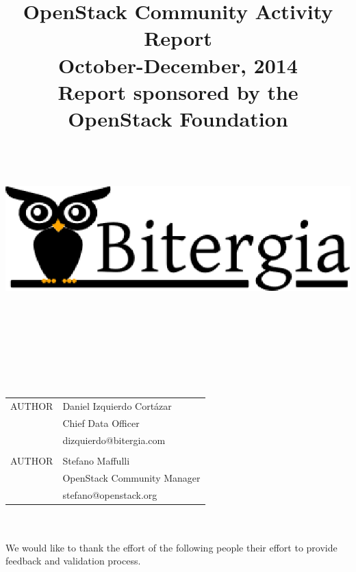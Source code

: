 \documentclass[a4wide,11pt]{report}
\begin{document}
\title{OpenStack Community Activity Report\\
      October-December, 2014 \\
      Report sponsored by the OpenStack Foundation\\
        ~~\\~~\\  \includegraphics[scale=.35]{logo.eps}       \\}




\maketitle


\newpage
~~\\~\\~\\~\\
\begin{tabular}{p{5cm}p{10cm}}
AUTHOR & Daniel Izquierdo Cort\'azar \\
       & Chief Data Officer  \\
       & dizquierdo@bitergia.com \\
       &  \\
AUTHOR  & Stefano Maffulli \\
        & OpenStack Community Manager \\
        & stefano@openstack.org \\
\end{tabular}

~~\\~~\\

We would like to thank the effort of the following people their effort to provide feedback and validation process. 

~~\\
~~\\
\end{document}
